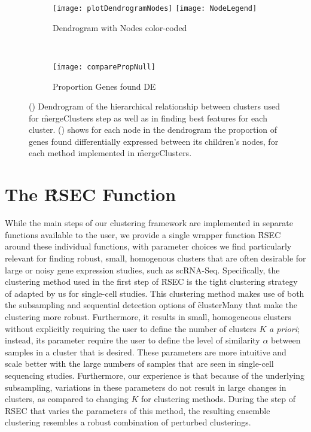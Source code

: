 \begin{figure}
	\begin{subfigure}{\textwidth}
	\texttt{[image: plotDendrogramNodes]}
	\texttt{[image: NodeLegend]}
	\caption{Dendrogram with Nodes color-coded\label{fig:dendNodes}}
	\end{subfigure}\\
	\begin{subfigure}{\textwidth}
	\texttt{[image: comparePropNull]}
\caption{Proportion Genes found DE\label{fig:nodePropNull}}
	\end{subfigure}
	\caption{(\protect{}) Dendrogram of the hierarchical relationship between clusters used for \f{mergeClusters} step as well as in finding best features for each cluster. (\protect{}) shows for each node in the dendrogram the proportion of genes found differentially expressed between its children's nodes, for each method implemented in \f{mergeClusters}. 
	\label{fig:nodeInfo}}
\end{figure}


\section{The \f{RSEC} Function}

While the main steps of our clustering framework are implemented in separate functions available to the user, we provide a single wrapper function \f{RSEC} around these individual functions, with  parameter choices we find particularly relevant for finding robust, small, homogenous clusters that are often desirable for large or noisy gene expression studies, such as scRNA-Seq. Specifically, the clustering method used in the first step of \f{RSEC} is the tight clustering strategy of \cite{Tseng:2005ir} adapted by us for single-cell studies. This clustering method makes use of both the subsampling and sequential detection options of \f{clusterMany} that make the clustering more robust.  Furthermore, it results in small, homogeneous clusters without explicitly requiring the user to define the number of clusters $K$ \emph{a priori}; instead, its parameter require the user to define the level of similarity $\alpha$ between samples in a cluster that is desired. These parameters are more intuitive and scale better with the large numbers of samples that are seen in single-cell sequencing studies. Furthermore, our experience is that because of the underlying subsampling, variations in these parameters do not result in large changes in clusters, as compared to changing $K$ for clustering methods. During the step of RSEC that varies the parameters of this method, the resulting ensemble clustering resembles a robust combination of perturbed clusterings.

